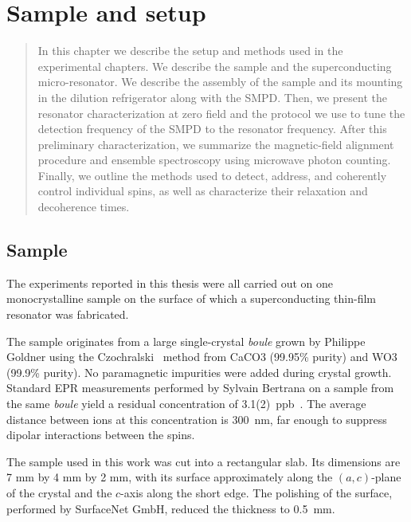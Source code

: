 \setchapterpreamble[u]{\margintoc}
\chapter{Sample and setup}


\begin{quote}
\itshape

In this chapter we describe the setup and methods used in the experimental chapters. We describe the \Ca sample and the superconducting micro-resonator. We describe the assembly of the sample and its mounting in the dilution refrigerator along with the SMPD. Then, we present the resonator characterization at zero field and the protocol we use to tune the detection frequency of the SMPD to the resonator frequency. After this preliminary characterization, we summarize the magnetic-field alignment procedure and ensemble \Er spectroscopy using microwave photon counting. Finally, we outline the methods used to detect, address, and coherently control individual \Er spins, as well as characterize their relaxation and decoherence times.

\end{quote}

\section{Sample}

The experiments reported in this thesis were all carried out on one monocrystalline \Ca sample on the surface of which a superconducting thin-film resonator was fabricated. 

The sample originates from a large single-crystal \textit{boule} grown by Philippe Goldner using the Czochralski~ method from CaCO3 (99.95\% purity) and WO3 (99.9\% purity). No paramagnetic impurities were added during crystal growth. Standard EPR measurements performed by Sylvain Bertrana on a sample from the same \textit{boule} yield a residual \Er concentration of 3.1(2)~ppb~. The average distance between \Er ions at this concentration is 300~nm, far enough to suppress dipolar interactions between the \Er spins.

The sample used in this work was cut into a rectangular slab. Its dimensions are 7 mm by 4 mm by 2 mm, with its surface approximately along the $(a,c)$-plane of the crystal and the $c$-axis along the short edge. The polishing of the surface, performed by SurfaceNet GmbH, reduced the thickness to 0.5~mm.


